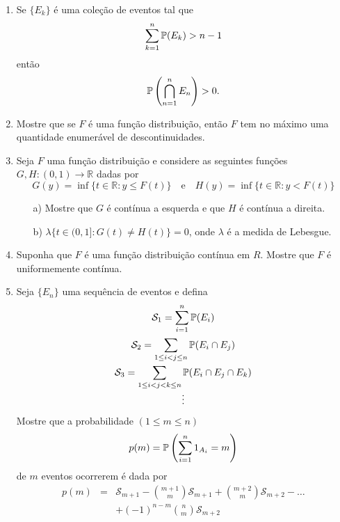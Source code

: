 \begin{enumerate}[leftmargin=*]
\item 
Se $\{E_k\}$ é uma coleção de eventos tal que 
	\[
		\sum_{k=1}^{n} \P(E_k) > n-1
	\]
então 
\[	
	\P\left(  \bigcap_{n=1}^{n} E_n\right) >0. 
\]	






\item 
Mostre que se $F$ é uma função distribuição, 
então $F$ tem no máximo uma quantidade enumerável 
de descontinuidades.






\item 
Seja $F$ uma função distribuição e considere as seguintes
funções $G,H:(0,1)\to \mathbb{R}$ dadas por 
	\[
		G(y)= \inf\{t\in\mathbb{R}: y\leq F(t) \}
		\quad
		\text{e}
		\quad
		H(y)= \inf\{t\in\mathbb{R}: y < F(t) \}
	\]
	\begin{itemize}
		\item[a)	]
		Mostre que $G$ é contínua a esquerda e que $H$
		é contínua a direita.  

		\item[b)] 
		$\lambda \{t\in (0,1]: G(t)\neq H(t) \} =0$, 
		onde $\lambda$ é a medida de Lebesgue. 
	\end{itemize}







\item 
Suponha que $F$ é uma função distribuição contínua 
em $R$. Mostre que $F$ é uniformemente contínua.




\item 
Seja $\{E_n\}$ uma sequência de eventos e defina
\[
\begin{array}{c}
	\displaystyle \mathcal{S}_{1} 
	= \sum_{i=1}^{n} \P(E_i) 
	\\[0.5cm]
	\displaystyle \mathcal{S}_{2} 
	= \sum_{1\leq i<j\leq n} \P(E_i\cap E_j) 
	\\[0.5cm]
	\displaystyle\mathcal{S}_{3} 
	= \sum_{1\leq i<j<k\leq n} \P(E_i\cap E_j\cap E_k ) 
	\\[0.3cm]
	\vdots
\end{array}
\]
	Mostre que a probabilidade $(1\leq m\leq n)$
		\[
			p(m) = \P\left( \sum_{i=1}^n 1_{A_i} = m \right)
		\]
	de $m$ eventos ocorrerem é dada por 
		\[
			\begin{array}{rcl}
			p(m) 
			&=&\displaystyle
			\mathcal{S}_{m+1} 
			- 
			\binom{m+1}{m}\mathcal{S}_{m+1}
			+
			\binom{m+2}{m}\mathcal{S}_{m+2}
			-
			\ldots
			\\[0.7cm]
			&&\displaystyle
			+ (-1)^{n-m} \binom{n}{m}\mathcal{S}_{m+2}			
			\end{array}
		\]







\end{enumerate}
